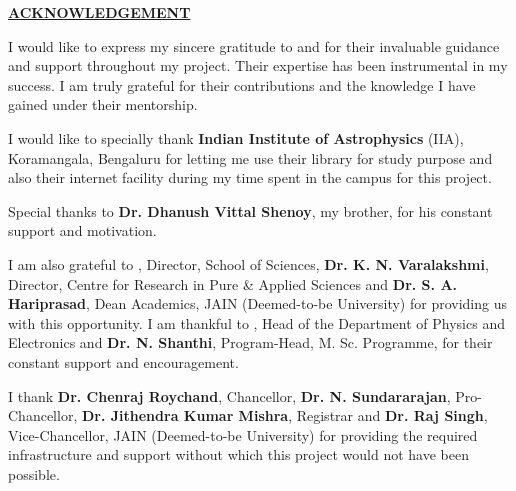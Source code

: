 \thispagestyle{empty}


\begin{center}
    \Large{\underline{\textbf{ACKNOWLEDGEMENT}}}\\
\end{center}

\vspace{0.5cm}

\noindent
I would like to express my sincere gratitude to \textbf{\gnameOne} and \textbf{\gnameTwo} for their invaluable guidance and support throughout my project. Their expertise has been instrumental in my success. I am truly grateful for their contributions and the knowledge I have gained under their mentorship.

\vspace{0.25cm}

\noindent I would like to specially thank \textbf{Indian Institute of Astrophysics} (IIA), Koramangala, Bengaluru for letting me use their library for study purpose and also their internet facility during my time spent in the campus for this project.

\vspace{0.25cm}

\noindent Special thanks to \textbf{Dr. Dhanush Vittal Shenoy}, my brother, for his constant support and motivation.

\vspace{0.25cm}

\noindent
I am also grateful to \textbf{\director}, Director, School of Sciences, \textbf{Dr. K. N. Varalakshmi}, Director, Centre for Research in Pure \& Applied Sciences and \textbf{Dr. S. A. Hariprasad}, Dean Academics, JAIN (Deemed-to-be University) for providing us with this opportunity. I am thankful to \textbf{\hod}, Head of the Department of Physics and Electronics and \textbf{Dr. N. Shanthi}, Program-Head, M. Sc. Programme, for their constant support and encouragement.

\vspace{0.25cm}

\noindent
I thank \textbf{Dr. Chenraj Roychand}, Chancellor, \textbf{Dr. N. Sundararajan}, Pro-Chancellor, \textbf{Dr. Jithendra Kumar Mishra}, Registrar and \textbf{Dr. Raj Singh}, Vice-Chancellor, JAIN (Deemed-to-be University) for providing the required infrastructure and support without which this project would not have been possible.

\vspace{0.25cm}

